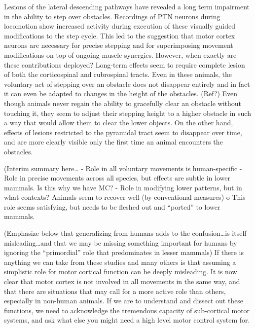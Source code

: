 Lesions of the lateral descending pathways have revealed a long term impairment in the ability to step over obstacles. Recordings of PTN neurons during locomotion show increased activity during execution of these visually guided modifications to the step cycle. This led to the suggestion that motor cortex neurons are necessary for precise stepping and for superimposing movement modifications on top of ongoing muscle synergies. However, when exactly are these contributions deployed? Long-term effects seem to require complete lesion of both the corticospinal and rubrospinal tracts. Even in these animals, the voluntary act of stepping over an obstacle does not disappear entirely and in fact it can even be adapted to changes in the height of the obstacles. (Ref?) Even though animals never regain the ability to gracefully clear an obstacle without touching it, they seem to adjust their stepping height to a higher obstacle in such a way that would allow them to clear the lower objects. On the other hand, effects of lesions restricted to the pyramidal tract seem to disappear over time, and are more clearly visible only the first time an animal encounters the obstacles.


 

(Interim summary here…
- Role in all voluntary movements is human-specific
- Role in precise movements across all species, but effects are subtle in lower mammals. Is this why we have MC?
- Role in modifying lower patterns, but in what contexts? Animals seem to recover well (by conventional measures)
o This role seems satisfying, but needs to be fleshed out and “ported” to lower mammals.


(Emphasize below that generalizing from humans adds to the confusion…is itself misleading…and that we may be missing something important for humans by ignoring the “primordial” role that predominates in lesser mammals)
If there is anything we can take from these studies and many others is that assuming a simplistic role for motor cortical function can be deeply misleading. It is now clear that motor cortex is not involved in all movements in the same way, and that there are situations that may call for a more active role than others, especially in non-human animals. If we are to understand and dissect out these functions, we need to acknowledge the tremendous capacity of sub-cortical motor systems, and ask what else you might need a high level motor control system for.

